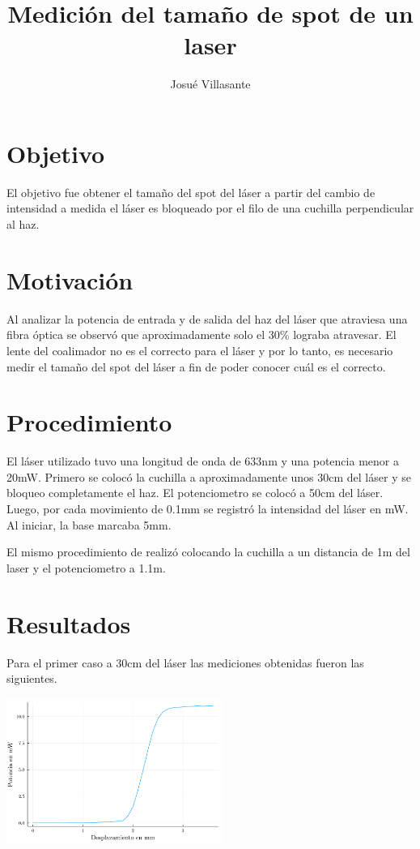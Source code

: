 \documentclass[twocolumn]{article}
\author{Josué Villasante}
\title{Medición del tamaño de spot de un laser}
\begin{document}
	\maketitle

	\section{Objetivo}
		El objetivo fue obtener el tamaño del spot del láser a partir del cambio de intensidad a medida el láser es bloqueado por el filo de una cuchilla perpendicular al haz.
	
	\section{Motivación}
		Al analizar la potencia de entrada y de salida del haz del láser que atraviesa una fibra óptica se observó que aproximadamente solo el 30\% lograba atravesar. El lente del coalimador no es el correcto para el láser y por lo tanto, es necesario medir el tamaño del spot del láser a fin de poder conocer cuál es el correcto.
	
	\section{Procedimiento}
		El láser utilizado tuvo una longitud de onda de 633nm y una potencia menor a 20mW. Primero se colocó la cuchilla a aproximadamente unos 30cm del láser y se bloqueo completamente el haz. El potenciometro se colocó a 50cm del láser. Luego, por cada movimiento de 0.1mm se registró la intensidad del láser en mW. Al iniciar, la base marcaba 5mm.

		El mismo procedimiento de realizó colocando la cuchilla a un distancia de 1m del laser y el potenciometro a 1.1m.

	\section{Resultados}
		Para el primer caso a 30cm del láser las mediciones obtenidas fueron las siguientes.

		\begin{center}
			\includegraphics[width=200pt]{img/measurement_1.pdf}
		\end{center}
\end{document}
